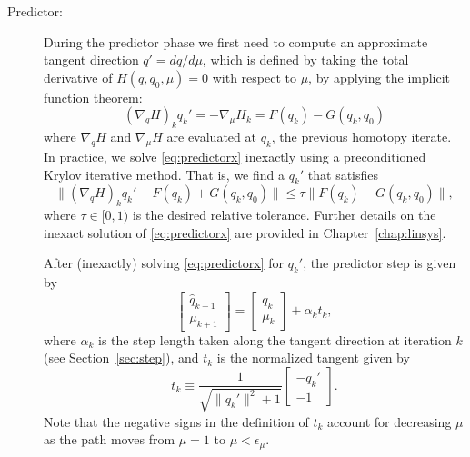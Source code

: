 \begin{description}\label{sec:desp}

  \item[Predictor:] During the predictor phase we first need to compute an
    approximate tangent direction $q' = dq/d\mu$, which is defined by taking the
    total derivative of $H(q,q_0,\mu) = 0$ with respect to $\mu$, \ie by applying the
    implicit function theorem:
    \begin{equation}
      \left(\nabla_q H\right)_{k} q_{k}' = -\nabla_\mu H_{k} = F(q_k)  - G(q_k,q_0)
      \label{eq:predictorx}
    \end{equation}
    where $\nabla_q H$ and $\nabla_\mu H$ are evaluated at $q_k$, the previous
    homotopy iterate.  In practice, we solve \eqref{eq:predictorx} inexactly
    using a preconditioned Krylov iterative method.  That is, we find a $q_{k}'$
    that satisfies
    \begin{equation*}
      \lVert \left(\nabla_q H\right)_{k} q_{k}' - F(q_k) + G(q_k,q_0) \rVert
      \leq \tau \lVert F(q_k)  - G(q_k,q_0) \rVert,
    \end{equation*}
    where $\tau \in [0,1)$ is the desired relative tolerance.  Further details
      on the inexact solution of \eqref{eq:predictorx} are provided in
      Chapter~\ref{chap:linsys}.
    
    After (inexactly) solving \eqref{eq:predictorx} for $q_{k}'$, the predictor
    step is given by
    \begin{equation}\label{eq:pred}
      \begin{bmatrix}
        \hat{q}_{k+1} \\ \mu_{k+1} 
      \end{bmatrix} 
      = \begin{bmatrix}
        q_k \\ \mu_k 
      \end{bmatrix}      
      + \alpha_{k} t_{k},
    \end{equation}
    where $\alpha_{k}$ is the step length taken along the tangent direction at
    iteration $k$ (see Section~\ref{sec:step}), and $t_k$ is the normalized
    tangent given by
    \begin{equation}\label{eq:tk}
      t_{k} \equiv \frac{1}{\sqrt{\|q_{k}'\|^2 + 1}} \begin{bmatrix} -q_k'
        \\ -1 \end{bmatrix}.
    \end{equation}
    Note that the negative signs in the definition of $t_k$ account for
    decreasing $\mu$ as the path moves from $\mu=1$ to $\mu <
\epsilon_\mu$.


\end{description}

